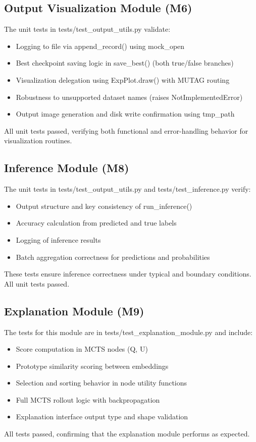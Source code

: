 \documentclass[12pt, titlepage]{article}
\begin{document}
\subsection{Output Visualization Module (M6)}
The unit tests in tests/test\_output\_utils.py validate:
\begin{itemize}
\item Logging to file via append\_record() using mock\_open
\item Best checkpoint saving logic in save\_best() (both true/false branches)
\item Visualization delegation using ExpPlot.draw() with MUTAG routing
\item Robustness to unsupported dataset names (raises NotImplementedError)
\item Output image generation and disk write confirmation using tmp\_path
\end{itemize}
All unit tests passed, verifying both functional and error-handling behavior for visualization routines.

\subsection{Inference Module (M8)}
The unit tests in tests/test\_output\_utils.py and tests/test\_inference.py verify:
\begin{itemize}
\item Output structure and key consistency of run\_inference()
\item Accuracy calculation from predicted and true labels
\item Logging of inference results
\item Batch aggregation correctness for predictions and probabilities
\end{itemize}
These tests ensure inference correctness under typical and boundary conditions. All unit tests passed.

\subsection{Explanation Module (M9)}
The tests for this module are in tests/test\_explanation\_module.py and include:
\begin{itemize}
\item Score computation in MCTS nodes (Q, U)
\item Prototype similarity scoring between embeddings
\item Selection and sorting behavior in node utility functions
\item Full MCTS rollout logic with backpropagation
\item Explanation interface output type and shape validation
\end{itemize}
All tests passed, confirming that the explanation module performs as expected.
\end{document}
